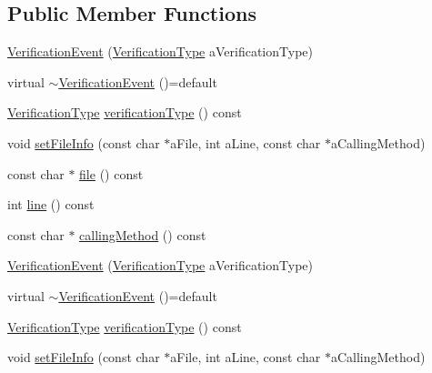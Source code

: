 \subsection*{Public Member Functions}
\begin{DoxyCompactItemize}
\item 
\mbox{\hyperlink{structfakeit_1_1VerificationEvent_afc2366f1ae4d03ec60cc2a2253a79728}{Verification\+Event}} (\mbox{\hyperlink{namespacefakeit_a9df22520dd60badb149c1d1d2518b253}{Verification\+Type}} a\+Verification\+Type)
\item 
virtual \mbox{\hyperlink{structfakeit_1_1VerificationEvent_a5bcca5502a6be4d65db30c1927652a77}{$\sim$\+Verification\+Event}} ()=default
\item 
\mbox{\hyperlink{namespacefakeit_a9df22520dd60badb149c1d1d2518b253}{Verification\+Type}} \mbox{\hyperlink{structfakeit_1_1VerificationEvent_a8b06372b0691ff1f6f2c4f59f5b05922}{verification\+Type}} () const
\item 
void \mbox{\hyperlink{structfakeit_1_1VerificationEvent_a6199b34d65e06976395f606f0c92f361}{set\+File\+Info}} (const char $\ast$a\+File, int a\+Line, const char $\ast$a\+Calling\+Method)
\item 
const char $\ast$ \mbox{\hyperlink{structfakeit_1_1VerificationEvent_ac5e560840147ea9e20e7e802470f4d8a}{file}} () const
\item 
int \mbox{\hyperlink{structfakeit_1_1VerificationEvent_a3069b93e69102a34fca21178e931e789}{line}} () const
\item 
const char $\ast$ \mbox{\hyperlink{structfakeit_1_1VerificationEvent_a13a854b648de4ed0a11d9f1bd3d22da5}{calling\+Method}} () const
\item 
\mbox{\hyperlink{structfakeit_1_1VerificationEvent_afc2366f1ae4d03ec60cc2a2253a79728}{Verification\+Event}} (\mbox{\hyperlink{namespacefakeit_a9df22520dd60badb149c1d1d2518b253}{Verification\+Type}} a\+Verification\+Type)
\item 
virtual \mbox{\hyperlink{structfakeit_1_1VerificationEvent_a5bcca5502a6be4d65db30c1927652a77}{$\sim$\+Verification\+Event}} ()=default
\item 
\mbox{\hyperlink{namespacefakeit_a9df22520dd60badb149c1d1d2518b253}{Verification\+Type}} \mbox{\hyperlink{structfakeit_1_1VerificationEvent_a8b06372b0691ff1f6f2c4f59f5b05922}{verification\+Type}} () const
\item 
void \mbox{\hyperlink{structfakeit_1_1VerificationEvent_a6199b34d65e06976395f606f0c92f361}{set\+File\+Info}} (const char $\ast$a\+File, int a\+Line, const char $\ast$a\+Calling\+Method)

\end{DoxyCompactItemize}
